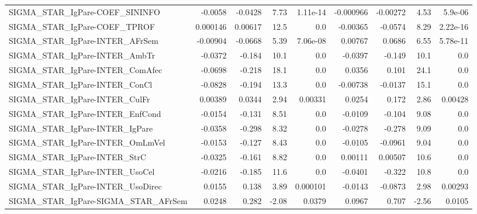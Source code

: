\begin{tabular}{lrrrrrrrr}
SIGMA\_STAR\_IgPare-COEF\_SININFO         &     -0.0058 &      -0.0428 &     7.73 & 1.11e-14 &  -0.000966 &    -0.00272 &         4.53 &       5.9e-06 \\
SIGMA\_STAR\_IgPare-COEF\_TPROF           &    0.000146 &      0.00617 &     12.5 &      0.0 &   -0.00365 &     -0.0574 &         8.29 &      2.22e-16 \\
SIGMA\_STAR\_IgPare-INTER\_AFrSem         &    -0.00904 &      -0.0668 &     5.39 & 7.06e-08 &    0.00767 &      0.0686 &         6.55 &      5.78e-11 \\
SIGMA\_STAR\_IgPare-INTER\_AmbTr          &     -0.0372 &       -0.184 &     10.1 &      0.0 &    -0.0397 &      -0.149 &         10.1 &           0.0 \\
SIGMA\_STAR\_IgPare-INTER\_ComAfec        &     -0.0698 &       -0.218 &     18.1 &      0.0 &     0.0356 &       0.101 &         24.1 &           0.0 \\
SIGMA\_STAR\_IgPare-INTER\_ConCl          &     -0.0828 &       -0.194 &     13.3 &      0.0 &   -0.00738 &     -0.0137 &         15.1 &           0.0 \\
SIGMA\_STAR\_IgPare-INTER\_CulFr          &     0.00389 &       0.0344 &     2.94 &  0.00331 &     0.0254 &       0.172 &         2.86 &       0.00428 \\
SIGMA\_STAR\_IgPare-INTER\_EnfCond        &     -0.0154 &       -0.131 &     8.51 &      0.0 &    -0.0109 &      -0.104 &         9.08 &           0.0 \\
SIGMA\_STAR\_IgPare-INTER\_IgPare         &     -0.0358 &       -0.298 &     8.32 &      0.0 &    -0.0278 &      -0.278 &         9.09 &           0.0 \\
SIGMA\_STAR\_IgPare-INTER\_OmLmVel        &     -0.0153 &       -0.127 &     8.43 &      0.0 &    -0.0105 &     -0.0961 &         9.04 &           0.0 \\
SIGMA\_STAR\_IgPare-INTER\_StrC           &     -0.0325 &       -0.161 &     8.82 &      0.0 &    0.00111 &     0.00507 &         10.6 &           0.0 \\
SIGMA\_STAR\_IgPare-INTER\_UsoCel         &     -0.0216 &       -0.185 &     11.6 &      0.0 &    -0.0401 &      -0.322 &         10.8 &           0.0 \\
SIGMA\_STAR\_IgPare-INTER\_UsoDirec       &      0.0155 &        0.138 &     3.89 & 0.000101 &    -0.0143 &     -0.0873 &         2.98 &       0.00293 \\
SIGMA\_STAR\_IgPare-SIGMA\_STAR\_AFrSem    &      0.0248 &        0.282 &    -2.08 &   0.0379 &     0.0967 &       0.707 &        -2.56 &        0.0105 \\

\end{tabular}
